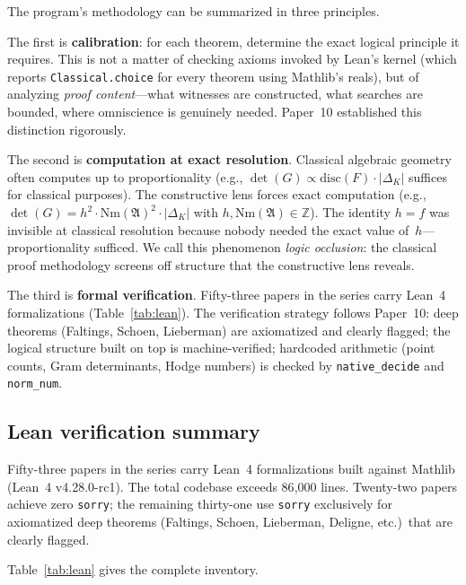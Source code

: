 \documentclass[11pt]{article}
\theoremstyle{plain}
\theoremstyle{definition}
\theoremstyle{remark}
\newcommand{\Z}{\mathbb{Z}}
\newcommand{\fA}{\mathfrak{A}}
\newcommand{\Nm}{\mathrm{Nm}}
\newcommand{\disc}{\mathrm{disc}}
\begin{document}
The program's methodology can be summarized in three principles.

The first is \textbf{calibration}: for each theorem, determine the
exact logical principle it requires.  This is not a matter of
checking axioms invoked by Lean's kernel (which reports
\texttt{Classical.choice} for every theorem using Mathlib's reals),
but of analyzing \emph{proof content}---what witnesses are
constructed, what searches are bounded, where omniscience is
genuinely needed.  Paper~10 established this distinction
rigorously.

The second is \textbf{computation at exact resolution}.  Classical
algebraic geometry often computes up to proportionality
(e.g., $\det(G) \propto \disc(F) \cdot |\Delta_K|$ suffices for
classical purposes).  The constructive lens forces exact
computation (e.g., $\det(G) = h^2 \cdot \Nm(\fA)^2 \cdot
|\Delta_K|$ with $h, \Nm(\fA) \in \Z$).  The identity $h = f$
was invisible at classical resolution because nobody needed
the exact value of~$h$---proportionality sufficed.  We call
this phenomenon \emph{logic occlusion}: the classical proof
methodology screens off structure that the constructive lens
reveals.

The third is \textbf{formal verification}.  Fifty-three papers
in the series carry Lean~4 formalizations (Table~\ref{tab:lean}).
The verification
strategy follows Paper~10: deep theorems (Faltings, Schoen,
Lieberman) are axiomatized and clearly flagged; the logical
structure built on top is machine-verified; hardcoded arithmetic
(point counts, Gram determinants, Hodge numbers) is checked by
\texttt{native\_decide} and \texttt{norm\_num}.

\subsection{Lean verification summary}

Fifty-three papers in the series carry Lean~4 formalizations
built against Mathlib (Lean~4 v4.28.0-rc1).  The total codebase
exceeds 86{,}000 lines.  Twenty-two papers achieve zero
\texttt{sorry}; the remaining thirty-one use \texttt{sorry}
exclusively for axiomatized deep theorems (Faltings, Schoen,
Lieberman, Deligne, etc.)\ that are clearly flagged.

Table~\ref{tab:lean} gives the complete inventory.
\end{document}
